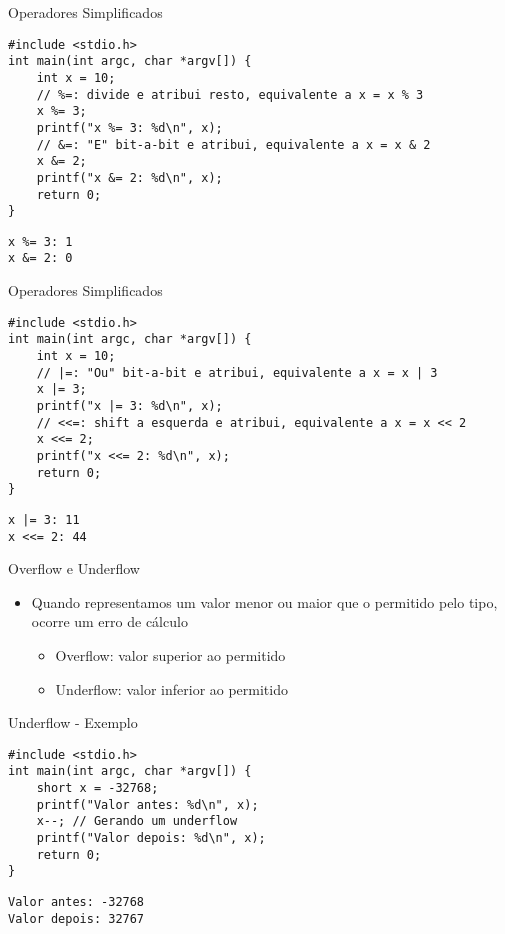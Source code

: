 \documentclass[t, aspectratio=169]{beamer}
\begin{document}
\begin{frame}[label={sec:org0dfd175},fragile]{Operadores Simplificados}
 \vspace{-0.5cm}
\begin{verbatim}
#include <stdio.h>
int main(int argc, char *argv[]) {
    int x = 10;
    // %=: divide e atribui resto, equivalente a x = x % 3
    x %= 3;
    printf("x %= 3: %d\n", x);
    // &=: "E" bit-a-bit e atribui, equivalente a x = x & 2
    x &= 2;
    printf("x &= 2: %d\n", x);
    return 0;
}
\end{verbatim}

\begin{verbatim}
x %= 3: 1
x &= 2: 0
\end{verbatim}
\end{frame}

\begin{frame}[label={sec:org81b72bc},fragile]{Operadores Simplificados}
 \vspace{-0.5cm}
\begin{verbatim}
#include <stdio.h>
int main(int argc, char *argv[]) {
    int x = 10;
    // |=: "Ou" bit-a-bit e atribui, equivalente a x = x | 3
    x |= 3;
    printf("x |= 3: %d\n", x);
    // <<=: shift a esquerda e atribui, equivalente a x = x << 2
    x <<= 2;
    printf("x <<= 2: %d\n", x);
    return 0;
}
\end{verbatim}

\begin{verbatim}
x |= 3: 11
x <<= 2: 44
\end{verbatim}
\end{frame}

\begin{frame}[label={sec:orgf00cb3c}]{Overflow e Underflow}
\begin{itemize}
\item Quando representamos um valor menor ou maior que o permitido pelo tipo, ocorre
um erro de cálculo
\begin{itemize}
\item Overflow: valor superior ao permitido
\item Underflow: valor inferior ao permitido
\end{itemize}
\end{itemize}
\end{frame}

\begin{frame}[label={sec:orgac66284},fragile]{Underflow - Exemplo}
 \vspace{-0.5cm}
\begin{verbatim}
#include <stdio.h>
int main(int argc, char *argv[]) {
    short x = -32768;
    printf("Valor antes: %d\n", x);
    x--; // Gerando um underflow
    printf("Valor depois: %d\n", x);
    return 0;
}
\end{verbatim}

\begin{verbatim}
Valor antes: -32768
Valor depois: 32767
\end{verbatim}
\end{frame}
\end{document}
